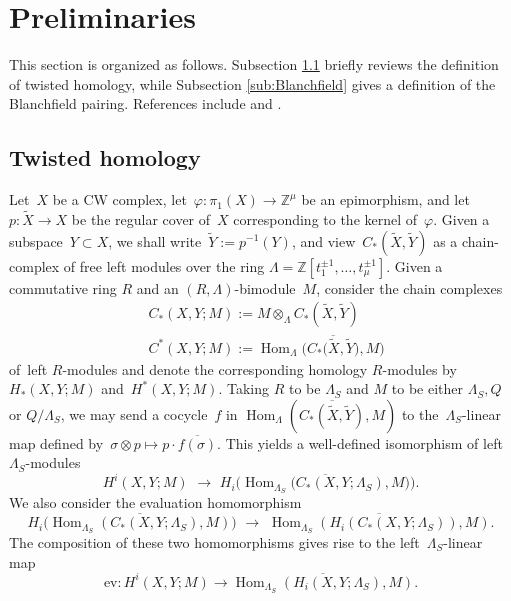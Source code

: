\documentclass[11pt,a4paper]{amsart}
\theoremstyle{definition}
\DeclareMathOperator{\Hom}{Hom}
\begin{document}
\section{Preliminaries}
\label{sec:Prelim}

This section is organized as follows. Subsection \ref{sub:TwistedHomology} briefly reviews the definition of twisted homology, while Subsection \ref{sub:Blanchfield} gives a definition of the Blanchfield pairing. References include \cite[Section 2]{FriedlLeidyNagelPowell} and \cite[Section 2]{FriedlPowell}.

\subsection{Twisted homology}
\label{sub:TwistedHomology}

Let~$X$ be a CW complex, let~$\varphi\colon \pi_1(X) \rightarrow \mathbb{Z}^\mu$ be an epimorphism, and let~$p\colon \widetilde{X} \rightarrow X$ be the regular cover of~$X$ corresponding to the kernel of~$\varphi$. Given a subspace~$ Y \subset X$, we shall write~$\widetilde{Y}:=p^{-1}(Y)$, and view~$C_*(\widetilde{X},\widetilde{Y})$ as a chain-complex of free left modules over the ring $\Lambda=\mathbb{Z}[t_1^{\pm 1},\dots,t_\mu^{\pm 1}]$. Given a commutative ring $R$ and an $(R,\Lambda)$-bimodule~$M$, consider the chain complexes
\begin{align*}
&C_*(X,Y;M):=M \otimes_{\Lambda}C_*(\widetilde{X},\widetilde{Y}) \\
&C^*(X,Y;M):=\Hom_{\Lambda}\Big(\overline{C_*\big(\widetilde{X},\widetilde{Y}\big)},M\Big)
\end{align*}
of~left $R$-modules and denote the corresponding homology $R$-modules by~$H_*(X,Y;M)$ and~$H^*(X,Y;M)$. Taking $R$ to be $\Lambda_S$ and $M$ to be either $\Lambda_S,Q$ or $Q / \Lambda_S$, we may send a cocycle~$f$ in $\Hom_{\Lambda} \left(  \overline{C_*(\widetilde{X},\widetilde{Y})},M \right)$ to the~$\Lambda_S$-linear map defined by~$\sigma\otimes p \mapsto p \cdot \overline{f(\sigma)}$. This yields a well-defined isomorphism of left $\Lambda_S$-modules  
$$ H^i(X,Y;M) \,\,\rightarrow\,\, H_i\Big(\overline{\Hom_{\Lambda_S}\big(C_*(X,Y;\Lambda_S),M\big)}\Big).$$
We also consider the evaluation homomorphism
$$  H_i\Big(\overline{\Hom_{\Lambda_S}(C_*(X,Y;\Lambda_S),M)}\Big) \,\,\rightarrow\,\, \overline{\Hom_{\Lambda_S}(H_i(C_*(X,Y;\Lambda_S)),M)}.$$
The composition of these two homomorphisms gives rise to the left~$\Lambda_S$-linear map 
$$\text{ev} \colon H^i(X,Y;M) \to \overline{\Hom_{\Lambda_S}(H_i(X,Y;\Lambda_S),M)}.$$
\end{document}
